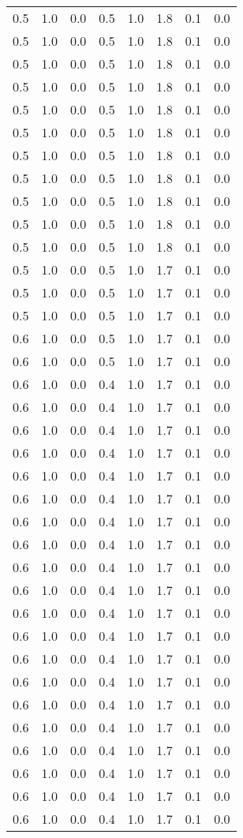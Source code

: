 \begin{tabular}{L{1in}|L{1in}|L{1in}|L{1in}|L{1in}|L{1in}|L{1in}|L{1in}}
0.5&1.0&0.0&0.5&1.0&1.8&0.1&0.0\\
0.5&1.0&0.0&0.5&1.0&1.8&0.1&0.0\\
0.5&1.0&0.0&0.5&1.0&1.8&0.1&0.0\\
0.5&1.0&0.0&0.5&1.0&1.8&0.1&0.0\\
0.5&1.0&0.0&0.5&1.0&1.8&0.1&0.0\\
0.5&1.0&0.0&0.5&1.0&1.8&0.1&0.0\\
0.5&1.0&0.0&0.5&1.0&1.8&0.1&0.0\\
0.5&1.0&0.0&0.5&1.0&1.8&0.1&0.0\\
0.5&1.0&0.0&0.5&1.0&1.8&0.1&0.0\\
0.5&1.0&0.0&0.5&1.0&1.8&0.1&0.0\\
0.5&1.0&0.0&0.5&1.0&1.8&0.1&0.0\\
0.5&1.0&0.0&0.5&1.0&1.7&0.1&0.0\\
0.5&1.0&0.0&0.5&1.0&1.7&0.1&0.0\\
0.5&1.0&0.0&0.5&1.0&1.7&0.1&0.0\\
0.6&1.0&0.0&0.5&1.0&1.7&0.1&0.0\\
0.6&1.0&0.0&0.5&1.0&1.7&0.1&0.0\\
0.6&1.0&0.0&0.4&1.0&1.7&0.1&0.0\\
0.6&1.0&0.0&0.4&1.0&1.7&0.1&0.0\\
0.6&1.0&0.0&0.4&1.0&1.7&0.1&0.0\\
0.6&1.0&0.0&0.4&1.0&1.7&0.1&0.0\\
0.6&1.0&0.0&0.4&1.0&1.7&0.1&0.0\\
0.6&1.0&0.0&0.4&1.0&1.7&0.1&0.0\\
0.6&1.0&0.0&0.4&1.0&1.7&0.1&0.0\\
0.6&1.0&0.0&0.4&1.0&1.7&0.1&0.0\\
0.6&1.0&0.0&0.4&1.0&1.7&0.1&0.0\\
0.6&1.0&0.0&0.4&1.0&1.7&0.1&0.0\\
0.6&1.0&0.0&0.4&1.0&1.7&0.1&0.0\\
0.6&1.0&0.0&0.4&1.0&1.7&0.1&0.0\\
0.6&1.0&0.0&0.4&1.0&1.7&0.1&0.0\\
0.6&1.0&0.0&0.4&1.0&1.7&0.1&0.0\\
0.6&1.0&0.0&0.4&1.0&1.7&0.1&0.0\\
0.6&1.0&0.0&0.4&1.0&1.7&0.1&0.0\\
0.6&1.0&0.0&0.4&1.0&1.7&0.1&0.0\\
0.6&1.0&0.0&0.4&1.0&1.7&0.1&0.0\\
0.6&1.0&0.0&0.4&1.0&1.7&0.1&0.0\\
0.6&1.0&0.0&0.4&1.0&1.7&0.1&0.0\\

\end{tabular}

